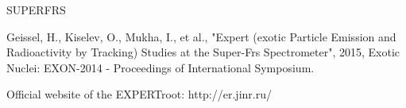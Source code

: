 \documentclass{webofc}
\begin{document}
\begin{thebibliography}{999}
	
	 SUPERFRS
	
	Geissel, H., Kiselev, O., Mukha, I., et al., "Expert (exotic Particle Emission and Radioactivity by Tracking) Studies at the Super-Frs Spectrometer", 2015, Exotic Nuclei: EXON-2014 - Proceedings of International Symposium.
	
	Official website of the EXPERTroot: 
	http://er.jinr.ru/
	
\end{thebibliography}
\end{document}
